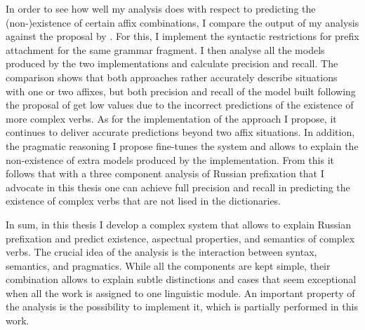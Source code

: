 In order to see how well my analysis does with respect to predicting the \mbox{(non-)}\linebreak[3]existence of certain affix combinations, I compare the output of my analysis against the proposal by \citet{Tatevosov:09}. For this, I implement the syntactic restrictions for prefix attachment for the same grammar fragment. I then analyse all the models produced by the two implementations and calculate precision and recall. The comparison shows that both approaches rather accurately describe situations with one or two affixes, but both precision and recall of the model built following the proposal of \citet{Tatevosov:09} get low values due to the incorrect predictions of the existence of more complex verbs. As for the implementation of the approach I propose, it continues to deliver accurate predictions beyond two affix situations. In addition, the pragmatic reasoning I propose fine-tunes the system and allows to explain the non-existence of extra models produced by the implementation. From this it follows that with a three component analysis of Russian prefixation that I advocate in this thesis one can achieve full precision and recall in predicting the existence of complex verbs that are not lised in the dictionaries.\largerpage

In sum, in this thesis I develop a complex system that allows to explain Russian prefixation and predict existence, aspectual properties, and semantics of complex verbs. The crucial idea of the analysis is the interaction between syntax, semantics, and pragmatics. While all the components are kept simple, their combination allows to explain subtle distinctions and cases that seem exceptional when all the work is assigned to one linguistic module. An important property of the analysis is the possibility to implement it, which is partially performed in this work.
